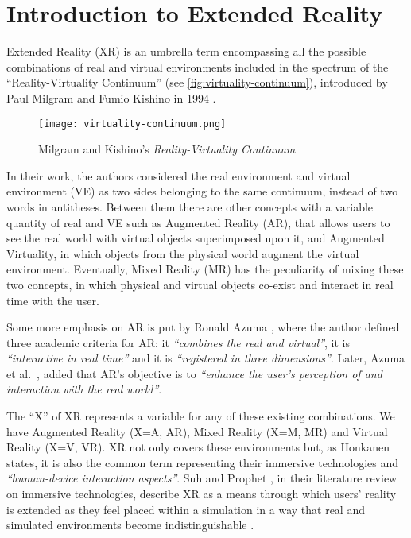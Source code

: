 \section{Introduction to Extended Reality}
\label{sec:background-intro}

Extended Reality (XR) is an umbrella term encompassing all the possible combinations of real and virtual environments included in the spectrum of the “Reality-Virtuality Continuum” (see \autoref{fig:virtuality-continuum}), introduced by Paul Milgram and Fumio Kishino in 1994 \cite{milgram_taxonomy_1994}.

\begin{figure}[h]
	\centering
	\texttt{[image: virtuality-continuum.png]}
	\caption{Milgram and Kishino's \textit{Reality-Virtuality Continuum}}
	\label{fig:virtuality-continuum}
\end{figure}
In their work, the authors considered the real environment and virtual environment (VE) as two sides belonging to the same continuum, instead of two words in antitheses. Between them there are other concepts with a variable quantity of real and VE such as Augmented Reality (AR), that allows users to see the real world with virtual objects superimposed upon it, and Augmented Virtuality, in which objects from the physical world augment the virtual environment. Eventually, Mixed Reality (MR) has the peculiarity of mixing these two concepts, in which physical and virtual objects co-exist and interact in real time with the user.

Some more emphasis on AR is put by Ronald Azuma \cite{azuma1997survey}, where the author defined three academic criteria for AR: it \textit{“combines the real and virtual”}, it is \textit{“interactive in real time”} and it is \textit{“registered in three dimensions”}. Later, Azuma et al.~\cite{azuma2001recent}, added that AR's objective is to \textit{“enhance the user’s perception of and interaction with the real world”}.

The “X” of XR represents a variable for any of these existing combinations. We have Augmented Reality (X=A, AR), Mixed Reality (X=M, MR) and Virtual Reality (X=V, VR). XR not only covers these environments but, as Honkanen \cite{honkanen_enhancing_2018} states, it is also the common term representing their immersive technologies and \textit{“human-device interaction aspects”}. Suh and Prophet \cite{suh_state_2018}, in their literature review on immersive technologies, describe XR as a means through which users' reality is extended as they feel placed within a simulation in a way that real and simulated environments become indistinguishable \cite{kwok_covid-19_2020}.

